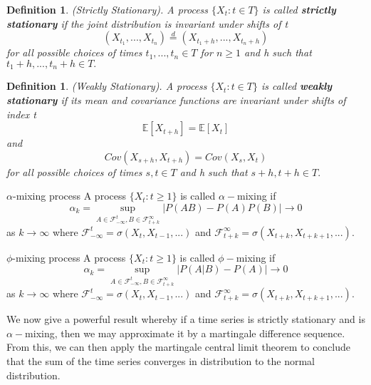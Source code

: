 \documentclass[twoside]{article}
\newtheorem{definition}[theorem]{Definition}
\begin{document}
\begin{definition}(Strictly Stationary). A process $\{X_t: t \in T\}$ is called \textbf{strictly stationary} if the joint distribution is invariant under shifts of t 
$$
(X_{t_{1}}, ..., X_{t_{n}}) \stackrel{d}{=} (X_{t_{1} + h}, ..., X_{t_{n} + h})
$$
for all possible choices of times $t_1, ..., t_n \in T$ for $n \geq 1$ and h such that $t_1 + h, ..., t_n + h \in T.$ 
\end{definition}

\begin{definition}(Weakly Stationary). A process $\{X_t: t \in T\}$ is called \textbf{weakly stationary} if its mean and covariance functions are invariant under shifts of index t 
$$
\mathbb{E}[X_{t + h}] = \mathbb{E}[X_t]
$$
and 
$$
Cov(X_{s + h}, X_{t + h}) = Cov(X_s, X_t)
$$
for all possible choices of times $s, t \in T$ and h such that $s + h, t+ h \in T.$
\end{definition}

\begin{definition_exam}{$\alpha$-mixing process}{} A process $\{X_t: t \geq 1\}$ is called $\alpha-$mixing if 
$$
\alpha_k = \sup_{A \in \mathcal{F}_{-\infty}^{t}, B \in \mathcal{F}_{t+k}^{\infty}}\big|P(AB) - P(A)P(B) \big| \rightarrow 0
$$
as $k \rightarrow \infty$ where $\mathcal{F}_{-\infty}^{t} = \sigma(X_t, X_{t-1}, ...)$ and $\mathcal{F}_{t+k}^{\infty} = \sigma(X_{t+k}, X_{t+k+1}, ... ).$
\end{definition_exam}

\begin{definition_exam}{$\phi$-mixing process}{} A process $\{X_t: t \geq 1\}$ is called $\phi-$mixing if 
$$
\alpha_k = \sup_{A \in \mathcal{F}_{-\infty}^{t}, B \in \mathcal{F}_{t+k}^{\infty}}\big|P(A|B) - P(A) \big| \rightarrow 0
$$
as $k \rightarrow \infty$ where $\mathcal{F}_{-\infty}^{t} = \sigma(X_t, X_{t-1}, ...)$ and $\mathcal{F}_{t+k}^{\infty} = \sigma(X_{t+k}, X_{t+k+1}, ... ).$
\end{definition_exam}

We now give a powerful result whereby if a time series is strictly stationary and is $\alpha-$mixing, then we may approximate it by a martingale difference sequence. From this, we can then apply the martingale central limit theorem to conclude that the sum of the time series converges in distribution to the normal distribution.
\end{document}
